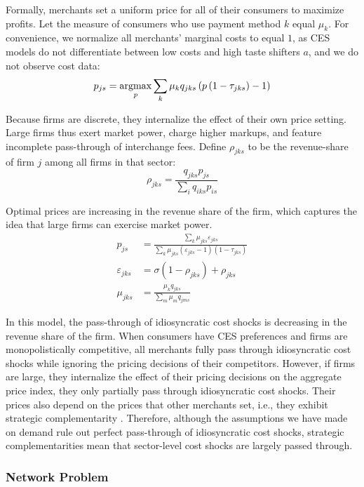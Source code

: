 \documentclass[main.tex]{subfiles}
\begin{document}
Formally, merchants set a uniform price for all of their consumers to maximize profits.
Let the measure of consumers who use payment method $k$ equal $\mu_k$.
For convenience, we normalize all merchants' marginal costs to equal $1$, as CES models do not differentiate between low costs and high taste shifters $a$, and we do not observe cost data:
\[
p_{js}=\argmax_{p}\sum_{k}\mu_k q_{jks}\left(p\left(1-\tau_{jks}\right)-1\right)
\]

Because firms are discrete, they internalize the effect of their own price setting.
Large firms thus exert market power, charge higher markups, and feature incomplete pass-through of interchange fees.
Define $\rho_{jks}$ to be the revenue-share of firm $j$ among all firms in that sector:
\[
\rho_{jks} =\frac{q_{jks}p_{js}}{\sum_{i}q_{iks}p_{is}}
\]

Optimal prices are increasing in the revenue share of the firm, which captures the idea that large firms can exercise market power. 
\begin{align}
  \label{eq:optimal-price-structural}
p_{js} & = \frac{\sum_{k}\mu_{jks}\varepsilon_{jks}}{\sum_{k}\mu_{jks}\left(\varepsilon_{jks}-1\right)\left(1-\tau_{jks}\right)} \\
  \varepsilon_{jks} & = \sigma(1-\rho_{jks}) + \rho_{jks} \\
\mu_{jks} & =\frac{\mu_k q_{jks}}{\sum_{m}\mu_m q_{jms}}
\end{align}

In this model, the pass-through of idiosyncratic cost shocks is decreasing in the revenue share of the firm. When consumers have CES preferences and firms are monopolistically competitive, all merchants fully pass through idiosyncratic cost shocks while ignoring the pricing decisions of their competitors. However, if firms are large, they internalize the effect of their pricing decisions on the aggregate price index, they only partially pass through idiosyncratic cost shocks. Their prices also depend on the prices that other merchants set, i.e., they exhibit strategic complementarity \citep{Amiti.etal2019}. Therefore, although the assumptions we have made on demand rule out perfect pass-through of idiosyncratic cost shocks, strategic complementarities mean that sector-level cost shocks are largely passed through.

\subsubsection{Network Problem}
\end{document}
